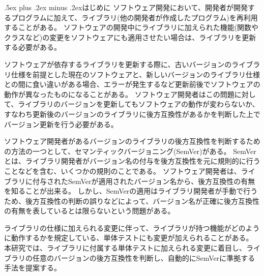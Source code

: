 \documentclass[twocolumn, a4paper, 9pt]{jarticle}
\makeatletter
\def\section{\@startsection{section}{1}{\z@}{2ex plus .2ex minus .2ex}%
  {.5ex plus .2ex minus .2ex}{\large\bfseries}}
\makeatother
\begin{document}


\section{はじめに}
ソフトウェア開発において、開発者が開発するプログラムに加えて、ライブラリ(他の開発者が作成したプログラム)を再利用することがある。
ソフトウェアの開発中にライブラリに加えられた機能(関数やクラスなど)の変更をソフトウェアにも適用させたい場合は、ライブラリを更新する必要がある。

ソフトウェアが依存するライブラリを更新する際に、古いバージョンのライブラリ仕様を前提とした現在のソフトウェアと、新しいバージョンのライブラリ仕様との間に食い違いがある場合、エラーが発生するなど更新前後でソフトウェアの動作が異なったものになることがある。
ソフトウェア開発者はこの問題に対して、ライブラリのバージョンを更新してもソフトウェアの動作が変わらないか、すなわち更新後のバージョンのライブラリに後方互換性があるかを判断した上でバージョン更新を行う必要がある。

ソフトウェア開発者があるバージョンのライブラリの後方互換性を判断するための方法の一つとして、セマンティックバージョニング(SemVer)がある。
SemVerとは、ライブラリ開発者がバージョン名の付与を後方互換性を元に規則的に行うことなどを含む、いくつかの規則のことである。
ソフトウェア開発者は、ライブラリに付与されたSemVerが適用されたバージョン名から、後方互換性の有無を知ることが出来る。
しかし、SemVerの適用はライブラリ開発者が手動で行うため、後方互換性の判断の誤りなどによって、バージョン名が正確に後方互換性の有無を表しているとは限らないという問題がある。

ライブラリの仕様に加えられる変更に伴って、ライブラリが持つ機能がどのように動作するかを規定している、単体テストにも変更が加えられることがある。
本研究では、ライブラリに付属する単体テストに加えられる変更に着目し、ライブラリの任意のバージョンの後方互換性を判断し、自動的にSemVerに準拠する手法を提案する。
\end{document}
